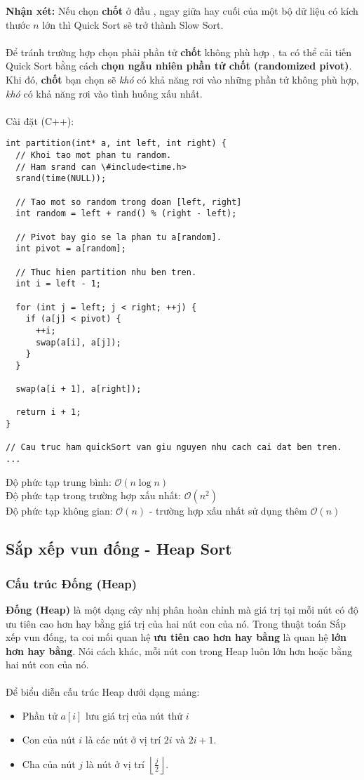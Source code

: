 \documentclass[]{article}
\begin{document}
\textbf{Nhận xét:} Nếu chọn \textbf{chốt} ở đầu , ngay giữa hay cuối của một bộ dữ liệu có kích thước $n$ lớn thì Quick Sort sẽ trở thành Slow Sort.
\\\\
Để tránh trường hợp chọn phải phần tử \textbf{chốt} không phù hợp , ta có thể cải tiến Quick Sort bằng cách \textbf{chọn ngẫu nhiên phần tử chốt (randomized pivot)}. Khi đó, \textbf{chốt} bạn chọn sẽ \textit{khó} có khả năng rơi vào những phần tử không phù hợp, \textit{khó} có khả năng rơi vào tình huống xấu nhất. \cite{LMHoang}
\\\\
Cài đặt (C++):
\begin{lstlisting}
int partition(int* a, int left, int right) {
  // Khoi tao mot phan tu random.
  // Ham srand can \#include<time.h>
  srand(time(NULL));

  // Tao mot so random trong doan [left, right]
  int random = left + rand() % (right - left);

  // Pivot bay gio se la phan tu a[random].
  int pivot = a[random];

  // Thuc hien partition nhu ben tren.
  int i = left - 1;

  for (int j = left; j < right; ++j) {
    if (a[j] < pivot) {
      ++i;
      swap(a[i], a[j]);
    }
  }

  swap(a[i + 1], a[right]);

  return i + 1;
}

// Cau truc ham quickSort van giu nguyen nhu cach cai dat ben tren.
...
\end{lstlisting}
Độ phức tạp trung bình: $\mathcal{O}(n \log n)$
\\
Độ phức tạp trong trường hợp xấu nhất: $\mathcal{O}(n^2)$
\\
Độ phức tạp không gian: $\mathcal{O}(n)$ - trường hợp xấu nhất sử dụng thêm $\mathcal{O}(n)$

\subsection{Sắp xếp vun đống - Heap Sort}
\subsubsection{Cấu trúc Đống (Heap)}
\textbf{Đống (Heap)} là một dạng cây nhị phân hoàn chỉnh mà giá trị tại mỗi nút có độ ưu tiên cao hơn hay bằng giá trị của hai nút con của nó. Trong thuật toán Sắp xếp vun đống, ta coi mối quan hệ \textbf{ưu tiên cao hơn hay bằng} là quan hệ \textbf{lớn hơn hay bằng}.\cite{LMHoang} Nói cách khác, mỗi nút con trong Heap luôn lớn hơn hoặc bằng hai nút con của nó.
\\\\
Để biểu diễn cấu trúc Heap dưới dạng mảng:
\begin{itemize}
\item Phần tử $a[i]$ lưu giá trị của nút thứ $i$
\item Con của nút $i$ là các nút ở vị trí $2i$ và $2i + 1$.
\item Cha của nút $j$ là nút ở vị trí $\displaystyle \left\lfloor\frac{j}{2}\right\rfloor$.
\end{itemize}
\end{document}
